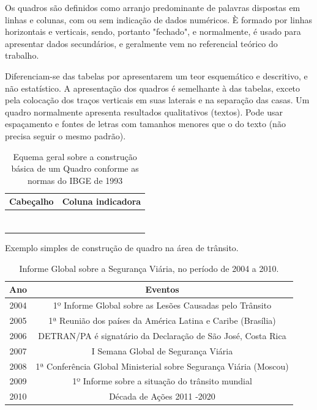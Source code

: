 Os quadros são definidos como arranjo predominante de palavras dispostas em linhas e colunas, com ou sem indicação de dados numéricos. È formado por linhas horizontais e verticais, sendo, portanto "fechado", e normalmente, é usado para apresentar dados secundários, e geralmente vem no referencial teórico do trabalho.\vskip0.3cm 

Diferenciam-se das tabelas por apresentarem um teor esquemático e descritivo, e não estatístico. A apresentação dos quadros é semelhante à das tabelas, exceto pela colocação dos traços verticais em suas laterais e na separação das casas. Um quadro normalmente apresenta resultados qualitativos (textos). Pode usar espaçamento e fontes de letras com tamanhos menores que o do texto (não precisa seguir o mesmo padrão).   

\newpage

\begin{table}[htp!]
    \centering
    \caption{Equema geral sobre a construção básica de um Quadro conforme as normas do IBGE de 1993}
    \begin{tabular}{|c|l|}
    \hline
    Cabeçalho  & Coluna indicadora   \\    
    \hline
           &           \\
           &              \\
           &              \\
           &              \\
           &              \\
           &              \\
           &              \\
  \hline
   \end{tabular}
\end{table}


Exemplo simples de construção de quadro na área de trânsito. 

\begin{table}[htp!]
    \centering
    \caption{Informe Global sobre a Segurança Viária, no período de 2004 a 2010.}
    \begin{tabular}{|c|c|}
    \hline\hline
    Ano    & Eventos  \\    
    \hline\hline
     2004  & 1º Informe Global sobre as Lesões Causadas pelo Trânsito     \\
     2005  & 1ª Reunião dos países da América Latina e Caribe (Brasília)  \\
     2006  & DETRAN/PA é signatário da Declaração de São José, Costa Rica  \\
     2007  & I Semana Global de Segurança Viária \\
     2008  & 1ª Conferência Global Ministerial sobre Segurança Viária (Moscou) \\
     2009  & 1º Informe sobre a situação do trânsito mundial \\
     2010  & Década de Ações 2011 -2020 \\
  \hline\hline
    \end{tabular}
\end{table}

